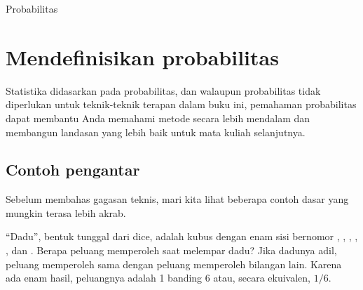 \begin{chapterpage}{Probabilitas}
  \label{probability}
  \label{ch_probability}
\end{chapterpage}
\renewcommand{\chapterfolder}{ch_probability}







\section{Mendefinisikan probabilitas}
\label{basicsOfProbability}

Statistika didasarkan pada probabilitas,
dan walaupun probabilitas tidak diperlukan untuk teknik-teknik
terapan dalam buku ini, pemahaman probabilitas dapat membantu Anda
memahami metode secara lebih mendalam dan membangun landasan yang lebih baik
untuk mata kuliah selanjutnya.


\subsection{Contoh pengantar}

Sebelum membahas gagasan teknis, mari kita lihat
beberapa contoh dasar yang mungkin terasa lebih akrab.

\begin{examplewrap}
\begin{nexample}{“Dadu”, bentuk tunggal dari dice, adalah kubus dengan enam sisi bernomor , , , , , dan . Berapa peluang memperoleh  saat melempar dadu?}\label{probOf1}
Jika dadunya adil, peluang memperoleh  sama dengan peluang memperoleh bilangan lain. Karena ada enam hasil, peluangnya adalah 1 banding 6 atau, secara ekuivalen, $1/6$.
\end{nexample}
\end{examplewrap}


